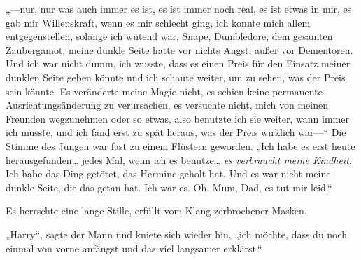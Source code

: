 „—nur, nur was auch immer es ist, es ist immer noch real, es ist etwas in mir, es gab mir Willenskraft, wenn es mir schlecht ging, ich konnte mich allem entgegenstellen, solange ich wütend war, Snape, Dumbledore, dem gesamten Zaubergamot, meine dunkle Seite hatte vor nichts Angst, außer vor Dementoren. Und ich war nicht dumm, ich wusste, dass es einen Preis für den Einsatz meiner dunklen Seite geben könnte und ich schaute weiter, um zu sehen, was der Preis sein könnte. Es veränderte meine Magie nicht, es schien keine permanente Ausrichtungsänderung zu verursachen, es versuchte nicht, mich von meinen Freunden wegzunehmen oder so etwas, also benutzte ich sie weiter, wann immer ich musste, und ich fand erst zu spät heraus, was der Preis wirklich war—“
Die Stimme des Jungen war fast zu einem Flüstern geworden.
„Ich habe es erst heute herausgefunden… jedes Mal, wenn ich es benutze… \emph{es verbraucht meine Kindheit}. Ich habe das Ding getötet, das Hermine geholt hat. Und es war nicht meine dunkle Seite, die das getan hat. Ich war es. Oh, Mum, Dad, es tut mir leid.“

Es herrschte eine lange Stille, erfüllt vom Klang zerbrochener Masken.

„Harry“, sagte der Mann und kniete sich wieder hin, „ich möchte, dass du noch einmal von vorne anfängst und das viel langsamer erklärst.“



